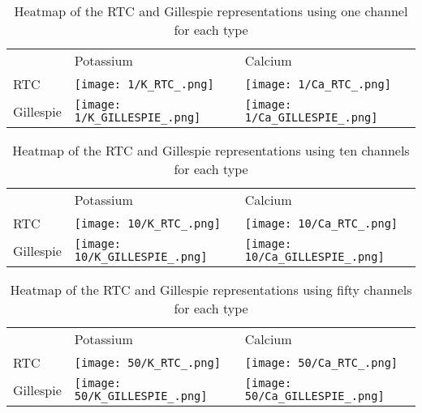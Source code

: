 \onecolumn
\begin{table}[]
    \centering
        \begin{tabular}{lll}
        & Potassium & Calcium\\
        RTC & 
        \texttt{[image: 1/K\_RTC\_.png]} & 
        \texttt{[image: 1/Ca\_RTC\_.png]} \\ 
        Gillespie & 
        \texttt{[image: 1/K\_GILLESPIE\_.png]} & 
        \texttt{[image: 1/Ca\_GILLESPIE\_.png]} \\ 
        \end{tabular}
    \caption{Heatmap of the RTC and Gillespie representations using one channel for each type}
    \label{tab:my_label}
\end{table}

\begin{table}[]
    \centering
    \begin{tabular}{lll}
        & Potassium & Calcium\\
        RTC & 
        \texttt{[image: 10/K\_RTC\_.png]} & 
        \texttt{[image: 10/Ca\_RTC\_.png]} \\ 
        Gillespie & 
        \texttt{[image: 10/K\_GILLESPIE\_.png]} & 
        \texttt{[image: 10/Ca\_GILLESPIE\_.png]} \\ 
    \end{tabular}
    \caption{Heatmap of the RTC and Gillespie representations using ten channels for each type}
    \label{tab:my_label}
\end{table}


\begin{table}[]
    \centering
    \begin{tabular}{lll}
    & Potassium & Calcium\\
    RTC & 
    \texttt{[image: 50/K\_RTC\_.png]} & 
    \texttt{[image: 50/Ca\_RTC\_.png]} \\ 
    Gillespie & 
    \texttt{[image: 50/K\_GILLESPIE\_.png]} & 
    \texttt{[image: 50/Ca\_GILLESPIE\_.png]} \\ 
    \end{tabular}
    \caption{Heatmap of the RTC and Gillespie representations using fifty channels for each type}
    \label{tab:my_label}
\end{table}

